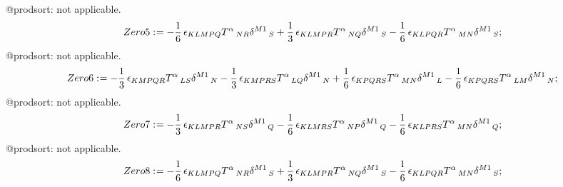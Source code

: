 \documentclass[11pt]{article}
\def\specialcolon{\mathrel{\mathop{:}}\hspace{-.5em}}
\begin{document}
@prodsort: not applicable.
\begin{dmath*}[compact, spread=2pt]
Zero5\specialcolon{}=  - \frac{1}{6}\, {\epsilon}_{K L M P Q} {T}^{\alpha}\,_{N R} {\delta}^{M1}\,_{S} + \frac{1}{3}\, {\epsilon}_{K L M P R} {T}^{\alpha}\,_{N Q} {\delta}^{M1}\,_{S} - \frac{1}{6}\, {\epsilon}_{K L P Q R} {T}^{\alpha}\,_{M N} {\delta}^{M1}\,_{S};
\end{dmath*}
@prodsort: not applicable.
\begin{dmath*}[compact, spread=2pt]
Zero6\specialcolon{}=  - \frac{1}{3}\, {\epsilon}_{K M P Q R} {T}^{\alpha}\,_{L S} {\delta}^{M1}\,_{N} - \frac{1}{3}\, {\epsilon}_{K M P R S} {T}^{\alpha}\,_{L Q} {\delta}^{M1}\,_{N} + \frac{1}{6}\, {\epsilon}_{K P Q R S} {T}^{\alpha}\,_{M N} {\delta}^{M1}\,_{L} - \frac{1}{6}\, {\epsilon}_{K P Q R S} {T}^{\alpha}\,_{L M} {\delta}^{M1}\,_{N};
\end{dmath*}
@prodsort: not applicable.
\begin{dmath*}[compact, spread=2pt]
Zero7\specialcolon{}=  - \frac{1}{3}\, {\epsilon}_{K L M P R} {T}^{\alpha}\,_{N S} {\delta}^{M1}\,_{Q} - \frac{1}{6}\, {\epsilon}_{K L M R S} {T}^{\alpha}\,_{N P} {\delta}^{M1}\,_{Q} - \frac{1}{6}\, {\epsilon}_{K L P R S} {T}^{\alpha}\,_{M N} {\delta}^{M1}\,_{Q};
\end{dmath*}
@prodsort: not applicable.
\begin{dmath*}[compact, spread=2pt]
Zero8\specialcolon{}=  - \frac{1}{6}\, {\epsilon}_{K L M P Q} {T}^{\alpha}\,_{N R} {\delta}^{M1}\,_{S} + \frac{1}{3}\, {\epsilon}_{K L M P R} {T}^{\alpha}\,_{N Q} {\delta}^{M1}\,_{S} - \frac{1}{6}\, {\epsilon}_{K L P Q R} {T}^{\alpha}\,_{M N} {\delta}^{M1}\,_{S};
\end{dmath*}
\end{document}
